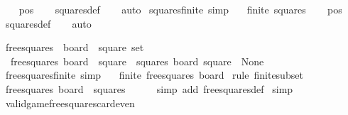 \begin{isabellebody}
%
\isadelimproof
\ \ %
\endisadelimproof
%
\isatagproof
{}\isamarkupfalse%
\ pos\isanewline
\ \ \isamarkupfalse%
\ squares{\isacharunderscore}def\isanewline
\ \ \isamarkupfalse%
\ auto%
\endisatagproof
{\isafoldproof}%
%
\isadelimproof
\isanewline
%
\endisadelimproof
\isanewline
{}\isamarkupfalse%
\ squares{\isacharunderscore}finite\ {\isacharbrackleft}simp{\isacharbrackright}{\isacharcolon}\isanewline
\ \ \ {\isachardoublequoteopen}finite\ squares{\isachardoublequoteclose}\isanewline
%
\isadelimproof
\ \ %
\endisadelimproof
%
\isatagproof
{}\isamarkupfalse%
\ pos\isanewline
\ \ \isamarkupfalse%
\ squares{\isacharunderscore}def\isanewline
\ \ \isamarkupfalse%
\ auto%
\endisatagproof
{\isafoldproof}%
%
\isadelimproof
%
\endisadelimproof
%
\begin{isamarkuptext}%
%
\end{isamarkuptext}\isamarkuptrue%
\isamarkupfalse%
\ free{\isacharunderscore}squares\ {\isacharcolon}{\isacharcolon}\ {\isachardoublequoteopen}board\ {\isasymRightarrow}\ square\ set{\isachardoublequoteclose}\ \isanewline
\ \ {\isachardoublequoteopen}free{\isacharunderscore}squares\ board\ {\isacharequal}\ {\isacharbraceleft}square\ {\isasymin}\ squares{\isachardot}\ board\ square\ {\isacharequal}\ None{\isacharbraceright}{\isachardoublequoteclose}\isanewline
\isanewline
{}\isamarkupfalse%
\ free{\isacharunderscore}squares{\isacharunderscore}finite\ {\isacharbrackleft}simp{\isacharbrackright}{\isacharcolon}\isanewline
\ \ \ {\isachardoublequoteopen}finite\ {\isacharparenleft}free{\isacharunderscore}squares\ board{\isacharparenright}{\isachardoublequoteclose}\isanewline
%
\isadelimproof
%
\endisadelimproof
%
\isatagproof
{}\isamarkupfalse%
\ {\isacharparenleft}rule\ finite{\isacharunderscore}subset{\isacharparenright}\isanewline
\ \ \isamarkupfalse%
\ {\isachardoublequoteopen}free{\isacharunderscore}squares\ board\ {\isasymsubseteq}\ squares{\isachardoublequoteclose}\isanewline
\ \ \ \ \isamarkupfalse%
\ {\isacharparenleft}simp\ add{\isacharcolon}\ free{\isacharunderscore}squares{\isacharunderscore}def{\isacharparenright}\isanewline
{}\isamarkupfalse%
\ simp%
\endisatagproof
{\isafoldproof}%
%
\isadelimproof
\isanewline
%
\endisadelimproof
\isanewline
{}\isamarkupfalse%
\ valid{\isacharunderscore}game{\isacharunderscore}free{\isacharunderscore}squares{\isacharunderscore}card{\isacharunderscore}even{\isacharcolon}\isanewline

\end{isabellebody}
